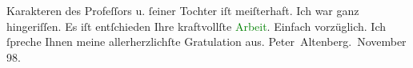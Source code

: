               Karakteren des Profeſſors u. ſeiner Tochter iſt meiſterhaft.\pend
           \pstart
           Ich war ganz hingeriſſen.\pend
           \pstart
           Es iſt entſchieden Ihre kraftvollſte \textcolor{green}{Arbeit}{}. Einfach vorzüglich.\pend
           \pstart
           Ich ſpreche Ihnen meine allerherzlichſte Gratulation aus.\pend
           \pstart \spacefill\mbox{Peter Altenberg}\pend{}. November 98.\pend
           \endnumbering{}  
      